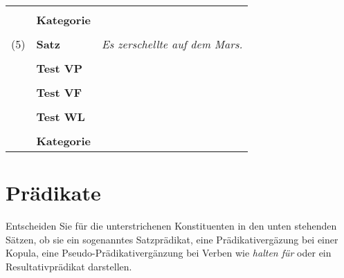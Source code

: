 \documentclass[12pt,a4paper,twoside]{article}
\begin{document}
\begin{center}
\begin{longtable}[h]{clp{}}
    &&\\
    & \textbf{Kategorie} & \\\cline{3-3}
    &&\\
    (5) & \textbf{Satz} & \textit{Es zerschellte auf dem Mars.} \\
    &&\\
    & \textbf{Test VP} & \\\cline{3-3}
    &&\\
    & \textbf{Test VF} & \\\cline{3-3}
    &&\\
    & \textbf{Test WL} & \\\cline{3-3}
    &&\\
    & \textbf{Kategorie} & \\\cline{3-3}
  \end{longtable}
\end{center}


\section{Prädikate}

Entscheiden Sie für die unterstrichenen Konstituenten in den unten stehenden Sätzen, ob sie ein sogenanntes Satzprädikat, eine Prädikativergäzung bei einer Kopula, eine Pseudo-Prädikativergänzung bei Verben wie \textit{halten für} oder ein Resultativprädikat darstellen.

\end{document}
